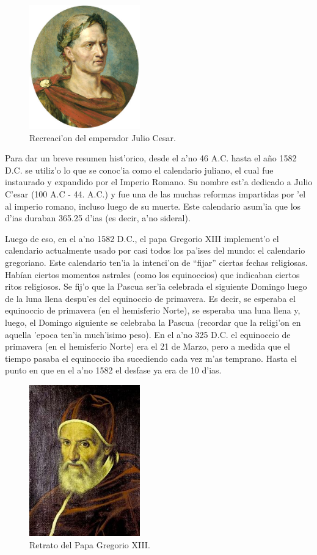 \documentclass{article}
\begin{document}
\begin{figure}
\includegraphics[width=4.8cm]{julio_cesar.jpg}
\caption{Recreaci'on del emperador Julio Cesar.}\label{julio_cesar}
\end{figure} 

Para dar un breve resumen hist'orico, desde el a'no 46 A.C. hasta el año 1582 D.C. se utiliz'o lo que se conoc'ia como el calendario juliano, el cual fue instaurado y expandido por el Imperio Romano. Su nombre est'a dedicado a Julio C'esar (100 A.C - 44. A.C.) y fue una de las muchas reformas impartidas por 'el al imperio romano, incluso luego de su muerte. Este calendario asum'ia que los d'ias duraban 365.25 d'ias (es decir, a'no sideral).

Luego de eso, en el a'no 1582 D.C., el papa Gregorio XIII implement'o el calendario actualmente usado por casi todos los pa'ises del mundo: el calendario gregoriano. Este calendario ten'ia la intenci'on de ``fijar'' ciertas fechas religiosas. Habían ciertos momentos astrales (como los equinoccios) que indicaban ciertos ritos religiosos. Se fij'o que la Pascua ser'ia celebrada el siguiente Domingo luego de la luna llena despu'es del equinoccio de primavera. Es decir, se esperaba el equinoccio de primavera (en el hemisferio Norte), se esperaba una luna llena y, luego, el Domingo siguiente se celebraba la Pascua (recordar que la religi'on en aquella 'epoca ten'ia much'isimo peso). En el a'no 325 D.C. el equinoccio de primavera (en el hemisferio Norte) era el 21 de Marzo, pero a medida que el tiempo pasaba el equinoccio iba sucediendo cada vez m'as temprano. Hasta el punto en que en el a'no 1582 el desfase ya era de 10 d'ias. 


\begin{figure}
\includegraphics[width=4.8cm]{gregorio_xiii.jpg}
\caption{Retrato del Papa Gregorio XIII.}\label{gregorio_xiii}
\end{figure} 
\end{document}
